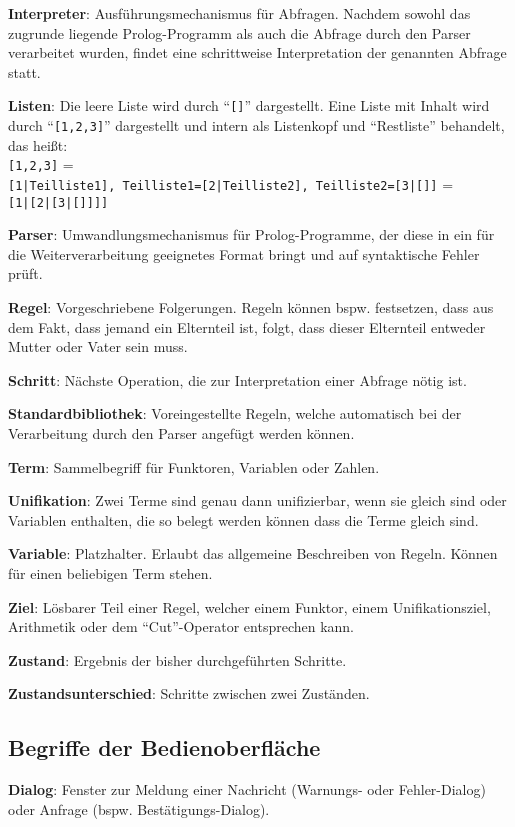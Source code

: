 \documentclass[parskip=full,11pt,twoside]{scrartcl}
\begin{document}
\textbf{Interpreter}:
Ausführungsmechanismus für Abfragen. Nachdem sowohl das zugrunde liegende Prolog-Programm als auch die Abfrage durch den Parser verarbeitet wurden, findet eine schrittweise Interpretation der genannten Abfrage statt.

\textbf{Listen}:
Die leere Liste wird durch \enquote{\texttt{[]}} dargestellt. Eine Liste mit Inhalt wird durch \enquote{\texttt{[1,2,3]}} dargestellt und intern als Listenkopf und \enquote{Restliste} behandelt, das heißt:\\
\texttt{[1,2,3]} =\\
\texttt{[1|Teilliste1], Teilliste1=[2|Teilliste2], Teilliste2=[3|[]]} =\\
\texttt{[1|[2|[3|[]]]]}

\textbf{Parser}:
Umwandlungsmechanismus für Prolog-Programme, der diese in ein für die Weiterverarbeitung geeignetes Format bringt und auf syntaktische Fehler prüft.

\textbf{Regel}:
Vorgeschriebene Folgerungen. Regeln können bspw. festsetzen, dass aus dem Fakt, dass jemand ein Elternteil ist, folgt, dass dieser Elternteil entweder Mutter oder Vater sein muss.

\textbf{Schritt}:
Nächste Operation, die zur Interpretation einer Abfrage nötig ist.

\textbf{Standardbibliothek}:
Voreingestellte Regeln, welche automatisch bei der Verarbeitung durch den Parser angefügt werden können.

\textbf{Term}:
Sammelbegriff für Funktoren, Variablen oder Zahlen.

\textbf{Unifikation}:
Zwei Terme sind genau dann unifizierbar, wenn sie gleich sind oder Variablen enthalten, die so belegt werden können dass die Terme gleich sind.

\textbf{Variable}:
Platzhalter. Erlaubt das allgemeine Beschreiben von Regeln. Können für einen beliebigen Term stehen.

\textbf{Ziel}:
Lösbarer Teil einer Regel, welcher einem Funktor, einem Unifikationsziel, Arithmetik oder dem \enquote{Cut}-Operator entsprechen kann.

\textbf{Zustand}:
Ergebnis der bisher durchgeführten Schritte.

\textbf{Zustandsunterschied}:
Schritte zwischen zwei Zuständen.

\subsection{Begriffe der Bedienoberfläche}
\textbf{Dialog}:
Fenster zur Meldung einer Nachricht (Warnungs- oder Fehler-Dialog) oder Anfrage (bspw. Bestätigungs-Dialog).
\end{document}
